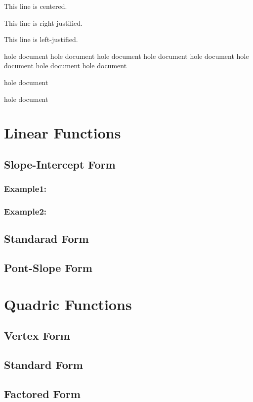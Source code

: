 \documentclass[11pt]{article}
\begin{document}
	\begin{center}
		This line is centered.
	\end{center}
	
	\begin{flushright}
		This line is right-justified.
	\end{flushright}
	
	\begin{flushleft}
		This line is left-justified.
	\end{flushleft}
	
	
	\Large	
	hole document hole document hole document hole document hole document
	hole document hole document hole document \begin{normalsize}hole document\end{normalsize} hole document
	
	\normalsize
	
	
	\section{Linear Functions}
		\subsection{Slope-Intercept Form}
			\subsubsection{Example1:}
			\subsubsection{Example2:}
		\subsection{Standarad Form}
		\subsection{Pont-Slope Form}
	
	\section{Quadric Functions}
		\subsection{Vertex Form}
		\subsection{Standard Form}
		\subsection{Factored Form}
	
	
	
	
	
	

	
	
	
	
	
\end{document}
